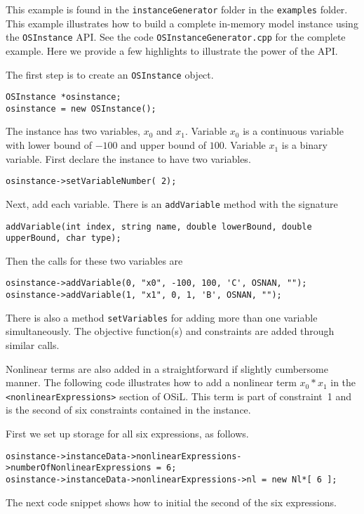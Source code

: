 \documentclass[11pt]{article}
\renewcommand{\_}{{\char"5F}}
\renewcommand{\{}{{\char"7B}}
\renewcommand{\}}{{\char"7D}}
\renewcommand{\^}{{\char"0D}}
\renewcommand{\'}{{\char"0D}}
\begin{document}
This example is found in the {\tt instanceGenerator} folder in the {\tt examples} folder. This example illustrates
how to build a complete in-memory model instance using the {\tt OSInstance} API.
See the code {\tt OSInstanceGenerator.cpp} for the complete example. Here we provide a few highlights to illustrate
the power of the API.

The first step is to create an {\tt OSInstance} object.
\begin{verbatim}
OSInstance *osinstance;
osinstance = new OSInstance();
\end{verbatim}

The instance has two variables, $x_{0}$ and $x_{1}$. Variable $x_{0}$ is a continuous variable with lower bound of $-100$ and upper bound of $100$. Variable $x_{1}$ is a binary variable. First declare the instance to have two variables.
\begin{verbatim}
osinstance->setVariableNumber( 2);
\end{verbatim}
Next, add each variable. There is an {\tt addVariable} method with the signature
\begin{verbatim}
addVariable(int index, string name, double lowerBound, double upperBound, char type);
\end{verbatim}
Then the calls for these two variables are
\begin{verbatim}
osinstance->addVariable(0, "x0", -100, 100, 'C', OSNAN, "");
osinstance->addVariable(1, "x1", 0, 1, 'B', OSNAN, "");
\end{verbatim}
There is also a method {\tt setVariables} for adding more than one variable simultaneously.  The objective function(s) and constraints are added through similar calls.

Nonlinear terms are also added in a straightforward if slightly cumbersome manner.   
The following code illustrates how to add a nonlinear term $x_{0}*x_{1}$ in the 
{\tt <nonlinearExpressions>} section of  OSiL. This term is part of constraint~1
and is the second of six constraints contained in the instance. 

First we set up storage for all six expressions, as follows.

\begin{verbatim}
osinstance->instanceData->nonlinearExpressions->numberOfNonlinearExpressions = 6;
osinstance->instanceData->nonlinearExpressions->nl = new Nl*[ 6 ];
\end{verbatim}

The next code snippet shows how to initial the second of the six expressions.
\end{document}
